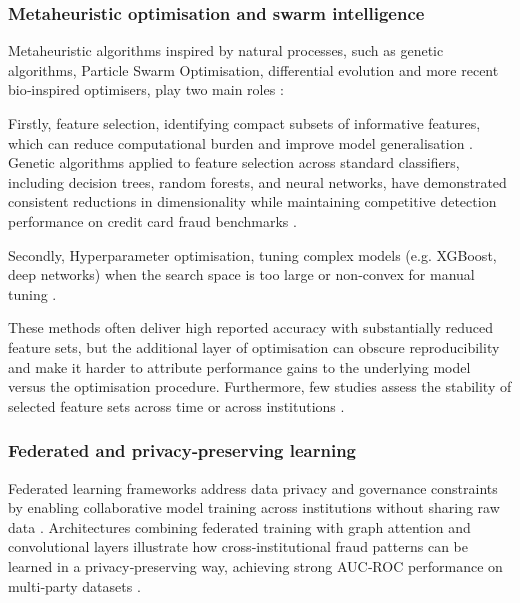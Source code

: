 \documentclass[a4paper,fleqn]{cas-dc}
\begin{document}
\subsubsection{Metaheuristic optimisation and swarm intelligence}
Metaheuristic algorithms inspired by natural processes, such as genetic algorithms, Particle Swarm Optimisation, differential evolution and more recent bio‑inspired optimisers, play two main roles \cite{abadlia_enhanced_2025, korkoman_evolutionary_2023}:

Firstly, feature selection, identifying compact subsets of informative features, which can reduce computational burden and improve model generalisation \cite{zhi_research_2025}.
Genetic algorithms applied to feature selection across standard classifiers, including decision trees, random forests, and neural networks, have demonstrated consistent reductions in dimensionality while maintaining competitive detection performance on credit card fraud benchmarks \cite{ileberi_machine_2022, krishnavardhan_intelligent_2024, sobana_sophisticated_2025, wei_evaluation_2023, yadav_unsupervised_2022}.

Secondly, Hyperparameter optimisation, tuning complex models (e.g. XGBoost, deep networks) when the search space is too large or non‑convex for manual tuning \cite{hu_hybrid_2025, sulaiman_credit_2024, wu_enhanced_2024, yadav_unsupervised_2022}.

These methods often deliver high reported accuracy with substantially reduced feature sets, but the additional layer of optimisation can obscure reproducibility and make it harder to attribute performance gains to the underlying model versus the optimisation procedure. Furthermore, few studies assess the stability of selected feature sets across time or across institutions \cite{sobana_sophisticated_2025}.

\subsubsection{Federated and privacy‑preserving learning}
Federated learning frameworks address data privacy and governance constraints by enabling collaborative model training across institutions without sharing raw data \cite{awosika_transparency_2024, zhang_optimization_2025}. 
Architectures combining federated training with graph attention and convolutional layers illustrate how cross‑institutional fraud patterns can be learned in a privacy‑preserving way, achieving strong AUC‑ROC performance on multi‑party datasets \cite{li_fedgat-dcnn_2024}.
\end{document}
